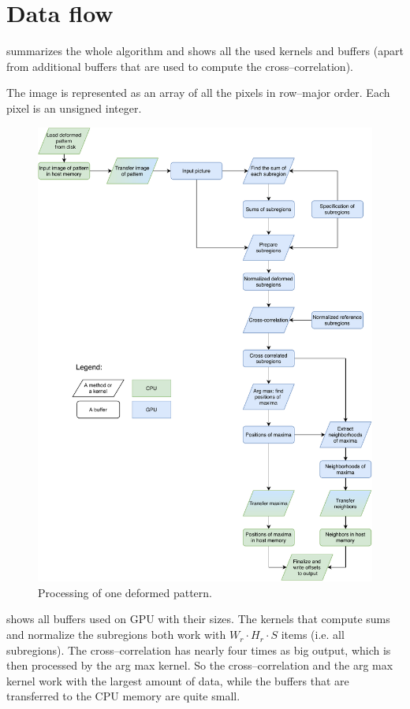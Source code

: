 \section{Data flow}

 summarizes the whole algorithm and shows all the used kernels and buffers (apart from additional buffers that are used to compute the cross--correlation).


The image is represented as an array of all the pixels in row--major order. Each pixel is an unsigned integer.

\begin{figure}
	\centering
	\includegraphics[width=\textwidth]{img/overview}
	\caption{Processing of one deformed pattern.}
	\label{overview}
\end{figure}

 shows all buffers used on GPU with their sizes. The kernels that compute sums and normalize the subregions both work with $W_r \cdot H_r \cdot S$ items (i.e. all subregions). The cross--correlation has nearly four times as big output, which is then processed by the arg max kernel. So the cross--correlation and the arg max kernel work with the largest amount of data, while the buffers that are transferred to the CPU memory are quite small.


